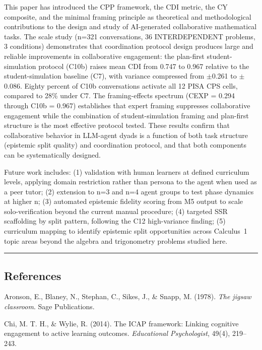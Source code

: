 \documentclass[
  11pt,
]{article}
\begin{document}
This paper has introduced the CPP framework, the CDI metric, the CY composite, and the minimal framing principle as theoretical and methodological contributions to the design and study of AI-generated collaborative mathematical tasks. The scale study (n=321 conversations, 36 INTERDEPENDENT problems, 3 conditions) demonstrates that coordination protocol design produces large and reliable improvements in collaborative engagement: the plan-first student-simulation protocol (C10b) raises mean CDI from 0.747 to 0.967 relative to the student-simulation baseline (C7), with variance compressed from $\pm$0.261 to $\pm$0.086. Eighty percent of C10b conversations activate all 12 PISA CPS cells, compared to 28\% under C7. The framing-effects spectrum (CEXP = 0.294 through C10b = 0.967) establishes that expert framing suppresses collaborative engagement while the combination of student-simulation framing and plan-first structure is the most effective protocol tested. These results confirm that collaborative behavior in LLM-agent dyads is a function of both task structure (epistemic split quality) and coordination protocol, and that both components can be systematically designed.

Future work includes: (1) validation with human learners at defined curriculum levels, applying domain restriction rather than persona to the agent when used as a peer tutor; (2) extension to n=3 and n=4 agent groups to test phase dynamics at higher n; (3) automated epistemic fidelity scoring from M5 output to scale solo-verification beyond the current manual procedure; (4) targeted SSR scaffolding by split pattern, following the C12 high-variance finding; (5) curriculum mapping to identify epistemic split opportunities across Calculus~1 topic areas beyond the algebra and trigonometry problems studied here.

\begin{center}\rule{0.5\linewidth}{0.5pt}\end{center}

\subsection{References}\label{references}

Aronson, E., Blaney, N., Stephan, C., Sikes, J., \& Snapp, M. (1978). \emph{The jigsaw classroom}. Sage Publications.

Chi, M. T. H., \& Wylie, R. (2014). The ICAP framework: Linking cognitive engagement to active learning outcomes. \emph{Educational Psychologist}, 49(4), 219--243.
\end{document}
